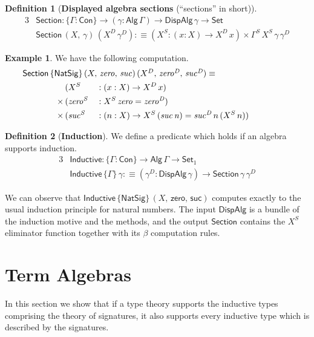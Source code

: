 \documentclass[12pt,a4paper,twoside,openany]{book}
\theoremstyle{remark}
\theoremstyle{definition}
\newtheorem{mydefinition}{Definition}
\newtheorem{myexample}{Example}
\theoremstyle{theorem}
\newcommand{\mi}[1]{\mathit{#1}}
\newcommand{\ms}[1]{\mathsf{#1}}
\newcommand{\Con}{\mathsf{Con}}
\newcommand{\Set}{\mathsf{Set}}
\newcommand{\Alg}{\ms{Alg}}
\newcommand{\DispAlg}{\ms{DispAlg}}
\newcommand{\Section}{\ms{Section}}
\newcommand{\Inductive}{\ms{Inductive}}
\newcommand{\defn}{:\equiv}
\begin{document}
\begin{mydefinition}[\textbf{Displayed algebra sections} (``sections'' in short)]
\begin{alignat*}{3}
  & \Section : \{\Gamma : \Con\} \to (\gamma : \Alg\,\Gamma) \to \DispAlg\,\gamma \to \Set\\
  & \Section\,(X,\,\gamma)\,(X^D\,\gamma^D) \defn (X^S : (x : X) \to X^D\,x) \times \Gamma^S\,X^S\,\gamma\,\gamma^D
\end{alignat*}
\end{mydefinition}
\begin{myexample} We have the following computation.
\begin{alignat*}{3}
  & \hspace{-5em}\rlap{$\Section\,\{\ms{NatSig}\}\,(X,\,\mi{zero},\,\mi{suc})\,(X^D,\,\mi{zero^D},\,\mi{suc^D}) \equiv$}\\
              & (X^S &&: (x : X) \to X^D\,x)\\
      \times\,& (\mi{zero^S} &&: X^S\,\mi{zero} = \mi{zero^D})\\
      \times\,& (\mi{suc^S} &&: (n : X) \to X^S\,(\mi{suc\,n}) = \mi{suc^D}\,n\,(X^S\,n))
\end{alignat*}
\end{myexample}

\begin{mydefinition}[\textbf{Induction}]
We define a predicate which holds if an algebra supports induction.
\begin{alignat*}{3}
  & \Inductive : \{\Gamma : \Con\} \to \Alg\,\Gamma \to \Set_1\\
  & \Inductive\,\{\Gamma\}\,\gamma \defn
     (\gamma^D : \DispAlg\,\gamma) \to \Section\,\gamma\,\gamma^D
\end{alignat*}
\end{mydefinition}

We can observe that $\Inductive\,\{\ms{NatSig}\}\,(X,\,\ms{zero},\,\ms{suc})$
computes exactly to the usual induction principle for natural numbers. The input
$\DispAlg$ is a bundle of the induction motive and the methods, and the output
$\Section$ contains the $X^S$ eliminator function together with its $\beta$
computation rules.

\section{Term Algebras}

In this section we show that if a type theory supports the inductive types comprising
the theory of signatures, it also supports every inductive type which is described
by the signatures.
\end{document}
